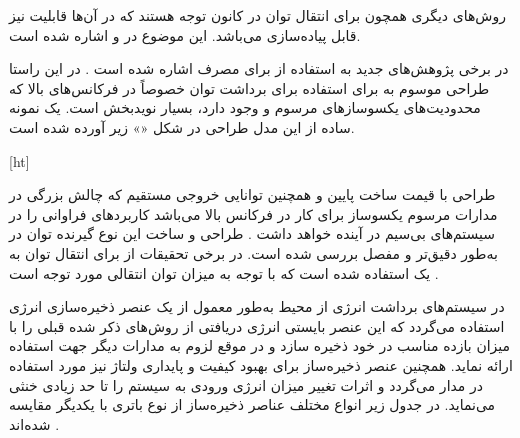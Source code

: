 روش‌های دیگری همچون   برای انتقال توان در کانون توجه هستند که در آن‌ها قابلیت  نیز قابل پیاده‌سازی می‌باشد. این موضوع در  و  اشاره شده است.

در برخی پژوهش‌های جدید به استفاده از  برای مصرف  اشاره شده است . در این راستا طراحی موسوم به  برای استفاده برای برداشت توان خصوصاً در فرکانس‌های بالا که محدودیت‌های یکسوسازهای مرسوم و وجود دارد، بسیار نویدبخش است. یک نمونه ساده از این مدل طراحی در شکل «» زیر آورده شده است.


[ht]





طراحی  با قیمت ساخت پایین و همچنین توانایی خروجی مستقیم  که چالش بزرگی در مدارات مرسوم یکسوساز برای کار در فرکانس بالا می‌باشد کاربردهای فراوانی را در سیستم‌های  بی‌سیم در آینده خواهد داشت . طراحی و ساخت این نوع گیرنده توان در  به‌طور دقیق‌تر و مفصل بررسی شده است.
در برخی تحقیقات از  برای انتقال توان به یک  استفاده شده است که با توجه به میزان توان انتقالی مورد توجه است .





در سیستم‌های برداشت انرژی از محیط به‌طور معمول از یک عنصر ذخیره‌سازی انرژی استفاده می‌گردد که این عنصر بایستی انرژی دریافتی از روش‌های ذکر شده قبلی را با میزان بازده مناسب در خود ذخیره سازد و در موقع لزوم به مدارات دیگر جهت استفاده ارائه نماید. همچنین عنصر ذخیره‌ساز برای بهبود کیفیت و پایداری ولتاژ نیز مورد استفاده در مدار می‌گردد و اثرات تغییر میزان انرژی ورودی به سیستم را تا حد زیادی خنثی می‌نماید. در جدول زیر انواع مختلف عناصر ذخیره‌ساز از نوع باتری با یکدیگر مقایسه شده‌اند .



